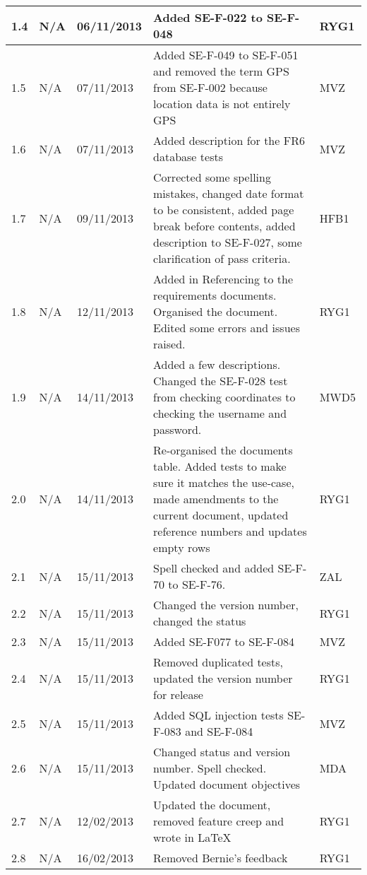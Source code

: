 \documentclass[12pt, portrait]{article}
\begin{document}
\begin{longtable}{|p{1.3cm}|p{1.5cm}|p{2cm}|p{7cm}| p{2cm}|}
\\
\hline 
	1.4&
N/A&
06/11/2013&
Added SE-F-022 to SE-F-048&
RYG1
 \\
\hline 
	1.5&
N/A&
07/11/2013&
Added SE-F-049 to SE-F-051 and removed the term GPS from SE-F-002 because location data is not entirely GPS&
MVZ
 \\
\hline
	1.6&
N/A&
07/11/2013&
Added description for the FR6 database tests&
MVZ
\\
\hline 
	1.7&
N/A&
09/11/2013&
Corrected some spelling mistakes, changed date format to be consistent, added page break before contents, added description to SE-F-027, some clarification of pass criteria.&
HFB1
 \\
\hline 
	1.8&
N/A&
12/11/2013&
Added in Referencing to the requirements documents. Organised the document. Edited some errors and issues raised.&
RYG1
 \\
\hline	
	1.9 &
N/A&
14/11/2013&
Added a few descriptions. Changed the SE-F-028 test from checking coordinates to checking the username and password.&
MWD5
\\
\hline 
	2.0&
N/A&
14/11/2013&
Re-organised the documents table. Added tests to make sure it matches the use-case, made amendments to the current document, updated reference numbers and updates empty rows&
RYG1
 \\
\hline
	2.1&
N/A&
15/11/2013&
Spell checked and added SE-F-70 to SE-F-76.&
ZAL
 \\
\hline 
	2.2&
N/A&
15/11/2013&
Changed the version number, changed the status&
RYG1
\\
\hline
	2.3&
N/A&
15/11/2013&
Added SE-F077 to SE-F-084&
MVZ
\\
\hline 
	2.4&
N/A&
15/11/2013&
Removed duplicated tests, updated the version number for release&
RYG1
 \\
\hline 
	2.5&
N/A&
15/11/2013&
Added SQL injection tests SE-F-083 and SE-F-084&
MVZ
 \\
\hline
2.6&
N/A&
15/11/2013&
Changed status and version number. Spell checked. Updated document objectives&
MDA \\ 
\hline 
2.7&N/A&12/02/2013&Updated the document, removed feature creep and wrote in LaTeX&RYG1
\\ 
\hline
2.8&N/A&16/02/2013&Removed Bernie's feedback&RYG1\\
\hline
\end{longtable}
\end{document}
